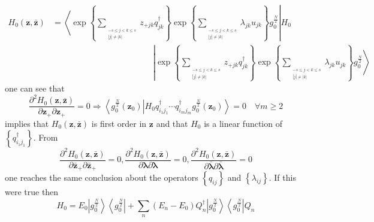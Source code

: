 \documentclass[aps,preprint]{revtex4}%
\begin{document}
\begin{align}
H_{0}\left(  \mathbf{z}{,\mathbf{\bar{z}}}\right)   &  =\left\langle \left.
\exp\left\{  \sum\limits_{_{\substack{-s\leq j<k\leq s\\\left\vert
j\right\vert \neq\left\vert k\right\vert }}}z_{+jk}q_{jk}^{\dagger}\right\}
\exp\left\{  \sum\limits_{_{\substack{-s\leq j<k\leq s\\\left\vert
j\right\vert \neq\left\vert k\right\vert }}}\lambda_{jk}u_{jk}\right\}
g_{0}^{\frac{N}{2}}\right\vert H_{0}\right. \nonumber\\
&  \quad\quad\quad\quad\quad\quad\quad\quad\quad\quad\quad\quad\left\vert
\exp\left\{  \sum\limits_{_{\substack{-s\leq j<k\leq s\\\left\vert
j\right\vert \neq\left\vert k\right\vert }}}z_{+jk}q_{jk}^{\dagger}\right\}
\exp\left\{  \sum\limits_{_{\substack{-s\leq j<k\leq s\\\left\vert
j\right\vert \neq\left\vert k\right\vert }}}\lambda_{jk}u_{jk}\right\}
g_{0}^{\frac{N}{2}}\right\rangle
\end{align}
one can see that
\begin{equation}
\frac{\partial^{2}H_{0}\left(  \mathbf{z}{,\mathbf{\bar{z}}}\right)
}{\partial\mathbf{z}_{+}\partial\mathbf{z}_{+}}=0\Rightarrow\left\langle
\left.  g_{0}^{\frac{N}{2}}\left(  \mathbf{z}_{0}\right)  \right\vert
H_{0}q_{i_{1}j_{1}}^{\dagger}\cdots q_{i_{m}j_{m}}^{\dagger}g_{0}^{\frac{N}%
{2}}\left(  \mathbf{z}_{0}\right)  \right\rangle =0\quad\forall m\geq2
\end{equation}
implies that $H_{0}\left(  \mathbf{z}{,\mathbf{\bar{z}}}\right)  $ is first
order in $\mathbf{z}$ and that $H_{0}$ is a linear function of $\left\{
q_{i_{1}j_{1}}^{\dagger}\right\}  $. From
\begin{equation}
\frac{\partial^{2}H_{0}\left(  \mathbf{z}{,\mathbf{\bar{z}}}\right)
}{\partial\mathbf{\bar{z}}_{+}\partial\mathbf{\bar{z}}_{+}}=0,\frac
{\partial^{2}H_{0}\left(  \mathbf{z}{,\mathbf{\bar{z}}}\right)  }%
{\partial\mathbf{\lambda}\partial\mathbf{\lambda}}=0,\frac{\partial^{2}%
H_{0}\left(  \mathbf{z}{,\mathbf{\bar{z}}}\right)  }{\partial\mathbf{\bar
{\lambda}}\partial\mathbf{\bar{\lambda}}}=0
\end{equation}
one reaches the same conclusion about the operators $\left\{  q_{ij}\right\}
$ and $\left\{  \lambda_{ij}\right\}  .$ If this were true then
\begin{equation}
H_{0}=E_{0}\left\vert g_{0}^{\frac{N}{2}}\right\rangle \left\langle
g_{0}^{\frac{N}{2}}\right\vert +\sum_{n}\left(  E_{n}-E_{0}\right)
Q_{n}^{\dagger}\left\vert g_{0}^{\frac{N}{2}}\right\rangle \left\langle
g_{0}^{\frac{N}{2}}\right\vert Q_{n}%
\end{equation}
\end{document}
